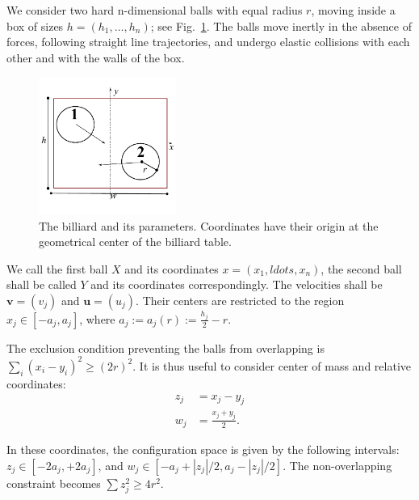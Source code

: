 \documentclass[superscriptaddress,pre,reprint,showpacs,twocolumn]{revtex4-1}
\newcommand{\defeq}{:=}
\begin{document}
We consider two hard n-dimensional balls  with equal radius $r$,
moving inside a box of sizes $h=(h_1, \ldots , h_n )$; see Fig.~\ref{billar01}. 
The balls move inertly in the absence of forces, 
following straight line trajectories,
and undergo elastic collisions with each 
other and with the walls of the box.

\begin{figure}[h]
  \begin{center}
    \includegraphics[width=0.40\textwidth]{figures/DiscsBox01.pdf}
  \end{center}
  \caption{The billiard and its parameters. Coordinates
    have their origin at the geometrical center of the 
    billiard table.}\label{billar01}
\end{figure}


We call the first ball $X$ and its coordinates $ x=(x_1,ldots,x_n)$,
the second ball shall be called $Y$ and its coordinates correspondingly.
The velocities shall be  $\mathbf{v} = (v_j)$ and $\mathbf{u} = (u_j)$. 
Their centers are restricted to the region 
$x_j \in [-a_j,a_j] $, where 
$a_j \defeq a_j(r) \defeq \frac{h_j}{2} - r $.

The exclusion condition preventing the balls from overlapping is $ \sum_i (x_i-y_i)^2  \ge (2r)^2$.
It is thus useful to consider center of mass and relative coordinates:
\begin{equation}\label{cambiocoor01}
 \begin{aligned}
z_j & = x_j -y_j \\
w_j & = \frac{x_j +y_j}{2} .
  \end{aligned}
\end{equation}

In these coordinates, the configuration space is given by the following
intervals:
$z_j \in [-2a_j , +2a_j]$, and
$w_j \in [-a_j + |z_j|/2, a_j - |z_j|/2]$.
The non-overlapping constraint becomes $\sum z_j^2 \ge 4 r^2$.
\end{document}
